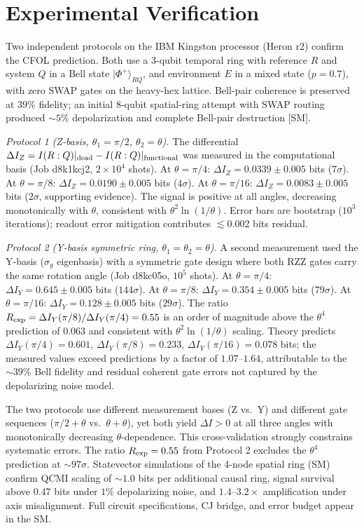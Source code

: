 \documentclass[twocolumn,aps,prl,floatfix]{revtex4-2}
\begin{document}
\section{Experimental Verification}

Two independent protocols on the IBM Kingston processor (Heron r2) confirm the CFOL prediction. Both use a 3-qubit temporal ring with reference $R$ and system $Q$ in a Bell state $|\Phi^+\rangle_{RQ}$, and environment $E$ in a mixed state ($p=0.7$), with zero SWAP gates on the heavy-hex lattice. Bell-pair coherence is preserved at $39\%$ fidelity; an initial 8-qubit spatial-ring attempt with SWAP routing produced $\sim5\%$ depolarization and complete Bell-pair destruction [SM].

\textit{Protocol 1 (Z-basis, $\theta_1=\pi/2$, $\theta_2=\theta$).} The differential $\Delta I_Z = I(R:Q)|_{\rm dead} - I(R:Q)|_{\rm functional}$ was measured in the computational basis (Job d8k1kcj2, $2\times10^4$ shots). At $\theta=\pi/4$: $\Delta I_Z = 0.0339 \pm 0.005$ bits ($7\sigma$). At $\theta=\pi/8$: $\Delta I_Z = 0.0190 \pm 0.005$ bits ($4\sigma$). At $\theta=\pi/16$: $\Delta I_Z = 0.0083 \pm 0.005$ bits ($2\sigma$, supporting evidence). The signal is positive at all angles, decreasing monotonically with $\theta$, consistent with $\theta^2\ln(1/\theta)$. Error bars are bootstrap ($10^3$ iterations); readout error mitigation contributes $\lesssim0.002$ bits residual.

\textit{Protocol 2 (Y-basis symmetric ring, $\theta_1=\theta_2=\theta$).} A second measurement used the Y-basis ($\sigma_y$ eigenbasis) with a symmetric gate design where both RZZ gates carry the same rotation angle (Job d8kc05o, $10^5$ shots). At $\theta=\pi/4$: $\Delta I_Y = 0.645 \pm 0.005$ bits ($144\sigma$). At $\theta=\pi/8$: $\Delta I_Y = 0.354 \pm 0.005$ bits ($79\sigma$). At $\theta=\pi/16$: $\Delta I_Y = 0.128 \pm 0.005$ bits ($29\sigma$). The ratio $R_{\rm exp} = \Delta I_Y(\pi/8)/\Delta I_Y(\pi/4) = 0.55$ is an order of magnitude above the $\theta^4$ prediction of $0.063$ and consistent with $\theta^2\ln(1/\theta)$ scaling. Theory predicts $\Delta I_Y(\pi/4)=0.601$, $\Delta I_Y(\pi/8)=0.233$, $\Delta I_Y(\pi/16)=0.078$ bits; the measured values exceed predictions by a factor of $1.07$--$1.64$, attributable to the $\sim39\%$ Bell fidelity and residual coherent gate errors not captured by the depolarizing noise model.

The two protocols use different measurement bases (Z vs.\ Y) and different gate sequences ($\pi/2+\theta$ vs.\ $\theta+\theta$), yet both yield $\Delta I>0$ at all three angles with monotonically decreasing $\theta$-dependence. This cross-validation strongly constrains systematic errors. The ratio $R_{\rm exp}=0.55$ from Protocol 2 excludes the $\theta^4$ prediction at ${\sim}97\sigma$. Statevector simulations of the 4-node spatial ring (SM) confirm QCMI scaling of ${\sim}1.0$ bits per additional causal ring, signal survival above $0.47$ bits under $1\%$ depolarizing noise, and $1.4$--$3.2\times$ amplification under axis misalignment. Full circuit specifications, CJ bridge, and error budget appear in the SM.
\end{document}
